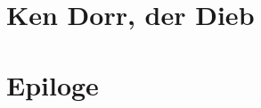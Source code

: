\newpage
\section{Ken Dorr, der Dieb}


























\newpage
\section{Epiloge}






















